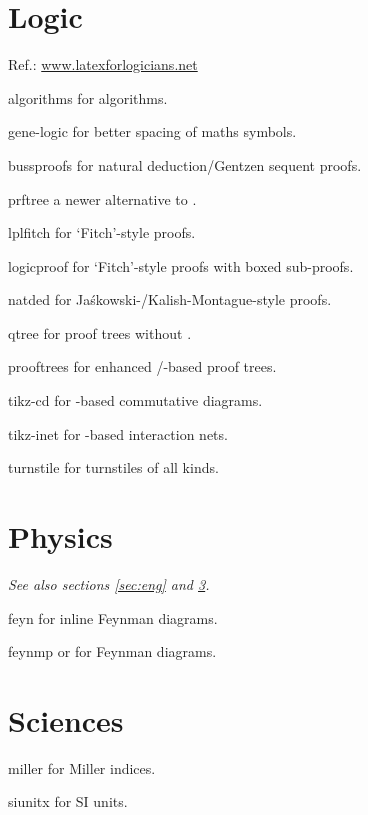 \documentclass[a4paper,welsh,british,twocolumn]{article}
\begin{document}
\section{Logic}\label{sec:logic}
Ref.: \url{www.latexforlogicians.net}
\begin{pkgdescription}
  \item[algorithms] for algorithms.
  \item[gene-logic] for better spacing of maths symbols.
  \item[bussproofs] for natural deduction/Gentzen sequent proofs.
  \item[prftree] a newer alternative to .
  \item[lplfitch] for ‘Fitch’-style proofs.
  \item[logicproof] for ‘Fitch’-style proofs with boxed sub-proofs.
  \item[natded] for Jaśkowski-/Kalish-Montague-style proofs.
  \item[qtree] for proof trees without .
  \item[prooftrees] for enhanced /-based proof trees.
  \item[tikz-cd] for -based commutative diagrams.
  \item[tikz-inet] for -based interaction nets.
  \item[turnstile] for turnstiles of all kinds.
\end{pkgdescription}
\section{Physics}\label{sec:phys}
\emph{See also sections \ref{sec:eng} and \ref{sec:sci}.}
\begin{pkgdescription}
  \item[feyn] for inline Feynman diagrams.
  \item[feynmp] or  for Feynman diagrams.
\end{pkgdescription}
\section{Sciences}\label{sec:sci}
\begin{pkgdescription}
  \item[miller] for Miller indices.
  \item[siunitx] for SI units.
\end{pkgdescription}
\end{document}
